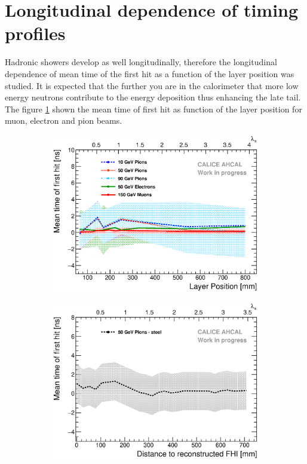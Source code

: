 \section{Longitudinal dependence of timing profiles}

Hadronic showers develop as well longitudinally, therefore the longitudinal dependence of mean time of the first hit as a function of the layer position was studied. It is expected that the further you are in the calorimeter that more low energy neutrons contribute to the energy deposition thus enhancing the late tail. The figure \ref{fig:Depth_Comparison} shown the mean time of first hit as function of the layer position for muon, electron and pion beams.

\begin{figure}[htbp!]
	\begin{subfigure}[t]{0.49\textwidth}
		\centering
		\includegraphics[width=1\textwidth]{../Thesis_Plots/Timing/Pions/Plots/Timing_Depth_Comparison_ShortAsymRange.eps}
		\caption{} \label{fig:Depth_Comparison}
	\end{subfigure}
	\hfill
	\begin{subfigure}[t]{0.49\textwidth}
		\centering
		\includegraphics[width=1\textwidth]{../Thesis_Plots/Timing/Pions/Plots/Timing_Depth_Comparison_ShortAsymRange_ShowerStart.eps}

\end{subfigure}
\end{figure}
